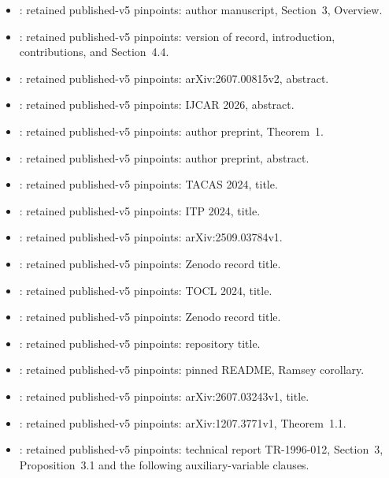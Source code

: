 \begin{itemize}
\item \cite{HKWB12}: retained published-v5 pinpoints: author manuscript, Section~3, Overview.
\item \cite{BBC+25}: retained published-v5 pinpoints: version of record, introduction, contributions, and
Section~4.4.
\item \cite{Sze26}: retained published-v5 pinpoints: arXiv:2607.00815v2, abstract.
\item \cite{KMS26}: retained published-v5 pinpoints: IJCAR 2026, abstract.
\item \cite{HKM16}: retained published-v5 pinpoints: author preprint, Theorem~1.
\item \cite{CFIM16}: retained published-v5 pinpoints: author preprint, abstract.
\item \cite{HS24}: retained published-v5 pinpoints: TACAS 2024, title.
\item \cite{SNG+24}: retained published-v5 pinpoints: ITP 2024, title.
\item \cite{Wes25}: retained published-v5 pinpoints: arXiv:2509.03784v1.
\item \cite{Gal26}: retained published-v5 pinpoints: Zenodo record title.
\item \cite{KS24}: retained published-v5 pinpoints: TOCL 2024, title.
\item \cite{SJXW26}: retained published-v5 pinpoints: Zenodo record title.
\item \cite{Zha26}: retained published-v5 pinpoints: repository title.
\item \cite{ZhJ26}: retained published-v5 pinpoints: pinned README, Ramsey corollary.
\item \cite{ABC+26}: retained published-v5 pinpoints: arXiv:2607.03243v1, title.
\item \cite{MORS15}: retained published-v5 pinpoints: arXiv:1207.3771v1, Theorem~1.1.
\item \cite{CGLR96}: retained published-v5 pinpoints: technical report TR-1996-012, Section~3,
Proposition~3.1 and the following auxiliary-variable clauses.
\end{itemize}
